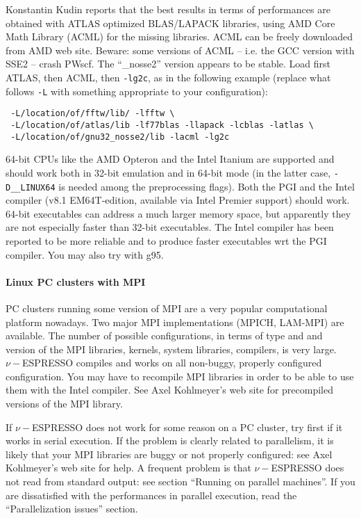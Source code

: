 \documentclass[12pt,a4paper]{article}
\begin{document}
Konstantin Kudin reports that the best results in terms of
performances are obtained with ATLAS optimized BLAS/LAPACK 
libraries, using AMD Core Math Library (ACML) for the missing 
libraries. ACML can be freely downloaded from AMD web site.
Beware: some versions of ACML -- i.e. the GCC version with SSE2 -- 
crash PWscf. The ``\_nosse2'' version appears to be stable. 
Load first ATLAS, then ACML, then \texttt{-lg2c}, as in the 
following example (replace what follows \texttt{-L} with 
something appropriate to your configuration):
\begin{verbatim}
 -L/location/of/fftw/lib/ -lfftw \
 -L/location/of/atlas/lib -lf77blas -llapack -lcblas -latlas \
 -L/location/of/gnu32_nosse2/lib -lacml -lg2c
\end{verbatim}
64-bit CPUs like the AMD Opteron and the Intel Itanium are
supported and should work both in 32-bit emulation and in
64-bit mode (in the latter case, \texttt{-D\_\_LINUX64} is 
needed among the preprocessing flags). Both the PGI and the
Intel compiler (v8.1 EM64T-edition, available via Intel Premier 
support) should work. 64-bit executables can address a 
much larger memory space, but apparently they are not especially
faster than 32-bit executables. The Intel compiler has been 
reported to be more reliable and to produce faster executables 
wrt the PGI compiler. You may also try with g95.

\paragraph{Linux PC clusters with MPI}

PC clusters running some version of MPI are a very popular 
computational platform nowadays. Two major MPI implementations 
(MPICH, LAM-MPI) are available. The number of possible
configurations, in terms of type and and version of the MPI 
libraries, kernels, system libraries, compilers, is very large. 
$\nu-$ESPRESSO compiles and works on all non-buggy, properly configured 
configuration. You may have to recompile MPI libraries in order 
to be able to use them with the Intel compiler. See Axel Kohlmeyer's 
web site for precompiled versions of the MPI library.

If $\nu-$ESPRESSO does not work for some reason on a PC cluster, try first 
if it works in serial execution. If the problem is clearly related to
parallelism, it is likely that your MPI libraries are buggy or not
properly configured: see Axel Kohlmeyer's web site for help.
A frequent problem is that $\nu-$ESPRESSO does not read from standard 
output: see section ``Running on parallel machines''.
If you are dissatisfied with the performances in parallel 
execution, read the ``Parallelization issues'' section.
\end{document}
